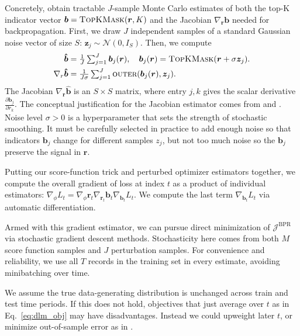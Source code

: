 Concretely, \citet{cordonnierDifferentiablePatchSelection2021} obtain tractable $J$-sample Monte Carlo estimates of both the top-K indicator vector $\bm{b} = \textsc{TopKMask}(\bm{r}, K)$ and the Jacobian $\nabla_{\bm{r}} \bm{b}$ needed for backpropagation.
First, we draw $J$ independent samples of a standard Gaussian noise vector of size $S$: $\bm{z}_j \sim \mathcal{N}(0, I_S)$. 
Then, we compute
\begin{align}
        \bm{\hat{b}} &= \textstyle \frac{1}{J} \sum_{j=1}^J \bm{b}_j(\bm{r}),
        \quad \bm{b}_j(\bm{r}) = \textsc{TopKMask}( \bm{r} + \sigma \bm{z}_j ).
        \notag
        \\ 
	\label{eq:grad_b_wrt_r}
    \nabla_{r} \bm{\hat{b}} &=
        \textstyle \frac{1}{J \sigma} \sum_{j=1}^J \textsc{outer}(
        \bm{b}_j(\bm{r}), \bm{z}_j).
\end{align}
The Jacobian $\nabla_{\bm{r}} \bm{\hat{b}}$ is an $S \times S$ matrix, where entry $j,k$ gives the scalar derivative $\frac{\partial \bm{b}_j}{\partial r_k}$. The conceptual justification for the Jacobian estimator comes from \citet{abernethyPerturbationTechniquesOnline2016} and \citet{berthetLearningDifferentiablePerturbed2020}.
Noise level $\sigma > 0$ is a hyperparameter that sets the strength of stochastic smoothing. It must be carefully selected in practice to add enough noise so that indicators $\bm{b}_j$ change for different samples $z_j$, but not too much noise so the $\bm{b}_j$ preserve the signal in $\bm{r}$. 

Putting our score-function trick and perturbed optimizer estimators together, we compute the overall gradient of loss at index $t$ as a product of individual estimators:
$\nabla_\phi L_t = \nabla_{\phi} \bm{r}_t \nabla_{\bm{r}_t} \bm{b}_t \nabla_{\bm{b}_t} L_t$.
We compute the last term $\nabla_{\bm{b}_t} L_t$ via automatic differentiation.

Armed with this gradient estimator, we can pursue direct minimization of $\mathcal{J}^{\text{BPR}}$ via stochastic gradient descent methods. Stochasticity here comes from both $M$ score function samples and $J$ perturbation samples. For convenience and reliability, we use all $T$ records in the training set in every estimate, avoiding minibatching over time.

We assume the true data-generating distribution is unchanged across train and test time periods. If this does not hold, objectives that just average over $t$ as in Eq.~\eqref{eq:dlm_obj} may have disadvantages. Instead we could upweight later $t$, or  minimize out-of-sample error as in \citet{gupta_decision-aware_2024}.



